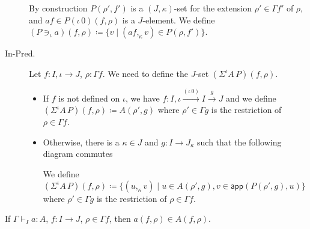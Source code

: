 \documentclass[english]{PaperTools/latex/lipics}
\newcommand\op[1]{∋_{#1}}
\newcommand\ip[3]{Σ^{#1} {#2}\,{#3}}
\def\app#1#2{\mathsf{app}(#1,#2)}
\begin{document}
\begin{description}

    By construction $P(ρ',f')$ is a $(J,κ)$-set for the extension $ρ' ∈ Γf'$ of $ρ$,
    and $af ∈ P(ι\,0)(f,ρ)$ is a $J$-element.
    We define $(P \op {ι} a)(f,ρ) ≔ \{ v \mid (af ,_κ v) ∈ P(ρ,f')\}$.

  \item[\sc In-Pred.]
    Let $f : I,ι → J$, $ρ : Γf$.  We need to define the $J$-set $(\ip {ι} A P)(f,ρ)$.

    \begin{itemize}
      \item If $f$ is not defined on $ι$, we have $f : I,ι \stackrel{(ι\,0)}{→} I \stackrel{g}{→} J$
        and we define $(\ip {ι} A P)(f,ρ) ≔ A(ρ',g)$
        where $ρ' ∈ Γg$ is the restriction of $ρ ∈ Γf$.

      \item Otherwise, there is a $κ ∈ J$ and $g : I → J_κ$ such that
        the following diagram commutes


        We define $(\ip {ι} A P)(f,ρ) ≔ \{ (u ,_κ v) \mid u ∈ A(ρ',g), v ∈ \app{P(ρ',g)}u\}$
        where $ρ' ∈ Γg$ is the restriction of $ρ ∈ Γf$.
    \end{itemize}
\end{description}

\begin{theorem}
  If $Γ ⊢_I a : A$, $f : I → J$, $ρ ∈ Γf$, then $a(f,ρ) ∈ A(f,ρ)$.
\end{theorem}
\end{document}
